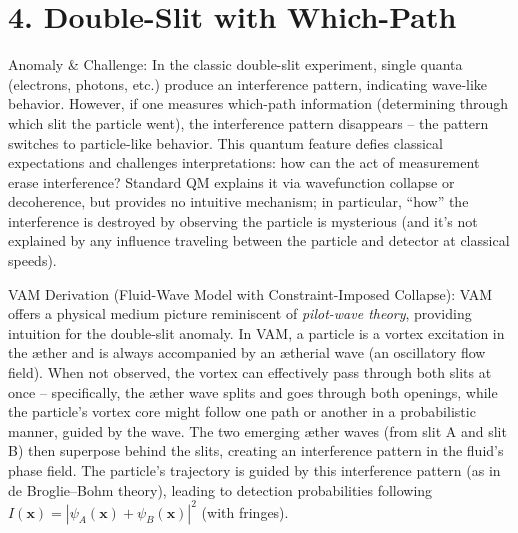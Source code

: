 \documentclass[a4paper, aps,preprint,superscriptaddress, 12pt]{revtex4}
\begin{document}
\section*{4. Double-Slit with Which-Path}

Anomaly \& Challenge: In the classic double-slit experiment, single quanta (electrons, photons, etc.) produce an interference pattern, indicating wave-like behavior. However, if one measures which-path information (determining through which slit the particle went), the interference pattern disappears – the pattern switches to particle-like behavior. This quantum feature defies classical expectations and challenges interpretations: how can the act of measurement erase interference? Standard QM explains it via wavefunction collapse or decoherence, but provides no intuitive mechanism; in particular, “how” the interference is destroyed by observing the particle is mysterious (and it’s not explained by any influence traveling between the particle and detector at classical speeds).


VAM Derivation (Fluid-Wave Model with Constraint-Imposed Collapse): VAM offers a physical medium picture reminiscent of \textit{pilot-wave theory}, providing intuition for the double-slit anomaly. In VAM, a particle is a vortex excitation in the æther and is always accompanied by an ætherial wave (an oscillatory flow field). When not observed, the vortex can effectively pass through both slits at once – specifically, the æther wave splits and goes through both openings, while the particle’s vortex core might follow one path or another in a probabilistic manner, guided by the wave. The two emerging æther waves (from slit A and slit B) then superpose behind the slits, creating an interference pattern in the fluid’s phase field. The particle’s trajectory is guided by this interference pattern (as in de Broglie–Bohm theory), leading to detection probabilities following $I(\mathbf{x}) = |\psi_A(\mathbf{x}) + \psi_B(\mathbf{x})|^2$ (with fringes).
\end{document}
